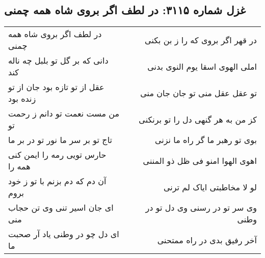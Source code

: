 \begin{center}
\section*{غزل شماره ۳۱۱۵: در لطف اگر بروی شاه همه چمنی}
\label{sec:3115}
\begin{longtable}{l p{0.5cm} r}
در لطف اگر بروی شاه همه چمنی
&&
در قهر اگر بروی که را ز بن بکنی
\\
دانی که بر گل تو بلبل چه ناله کند
&&
املی الهوی اسقا یوم النوی بدنی
\\
عقل از تو تازه بود جان از تو زنده بود
&&
تو عقل عقل منی تو جان جان منی
\\
من مست نعمت تو دانم ز رحمت تو
&&
کز من به هر گنهی دل را تو برنکنی
\\
تاج تو بر سر ما نور تو در بر ما
&&
بوی تو رهبر ما گر راه ما نزنی
\\
حارس تویی رمه را ایمن کنی همه را
&&
اهوی الهوا امنو فی ظل ذو المننی
\\
آن دم که دم بزنم با تو ز خود بروم
&&
لو لا مخاطبتی ایاک لم ترنی
\\
ای جان اسیر تنی وی تن حجاب منی
&&
وی سر تو در رسنی وی دل تو در وطنی
\\
ای دل چو در وطنی یاد آر صحبت ما
&&
آخر رفیق بدی در راه ممتحنی
\\
\end{longtable}
\end{center}
